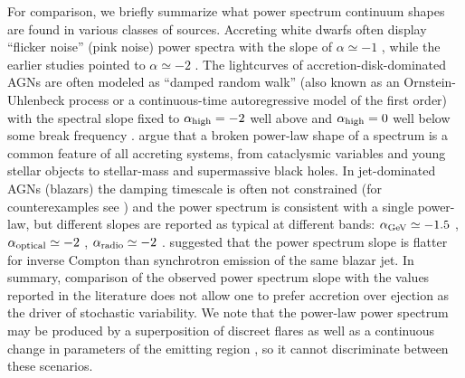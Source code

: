 \documentclass[twocolumn]{aastex631}
\begin{document}
For comparison, we briefly summarize what power spectrum continuum shapes are
found in various classes of sources. 
Accreting white dwarfs often display ``flicker noise'' (pink noise) power spectra with
the slope of $\alpha \simeq -1$ 
\citep{2008ApJ...676.1240B,2012MNRAS.420.2467D,2016MNRAS.463.3799B,2022MNRAS.509.4669B},
while the earlier studies pointed to $\alpha \simeq -2$ \citep{1986MNRAS.220..895E,1992A&A...266..237B}.
The lightcurves of accretion-disk-dominated AGNs are often modeled as ``damped random walk'' 
(also known as an Ornstein-Uhlenbeck process or a continuous-time autoregressive model of the first order) 
with the spectral slope fixed to $\alpha_{\rm high}= -2$ well above and $\alpha_{\rm high}= 0$ well below 
some break frequency \citep{2010ApJ...721.1014M,2020ApJ...899..136B,2022MNRAS.514..164S}. 
\cite{2015SciA....1E0686S} argue that a broken power-law shape of a spectrum is 
a common feature of all accreting systems, from cataclysmic variables 
and young stellar objects to stellar-mass and supermassive black holes.
In jet-dominated AGNs (blazars) the damping timescale is
often not constrained (for counterexamples see \citealt{2014ApJ...786..143S}) 
and the power spectrum is consistent with a single
power-law, but different slopes are reported as typical at different bands:
$\alpha_{\rm GeV} \simeq -1.5$ \citep{2014MNRAS.445..428M,2020ApJS..250....1T,2020ApJ...891..120B}, 
$\alpha_{\rm optical} \simeq -2$ \citep{2021Sci...373..789B,2023MNRAS.518.1459P}, 
$\alpha_{\rm radio} \simeq -2$ \citep{2014MNRAS.445..428M,2017ApJ...834..157P}.
\cite{2022ApJ...927..214G} suggested that the power spectrum slope is flatter for 
inverse Compton than synchrotron emission of the same blazar jet.
In summary, comparison of the observed power spectrum slope with
the values reported in the literature does not allow one to prefer accretion
over ejection as the driver of stochastic variability.
We note that the power-law power spectrum may be produced by 
a superposition of discreet flares \citep{1972ApJ...174L..35T,1993NCimC..16..675B} 
as well as a continuous change in parameters of the emitting region
\citep{1997MNRAS.292..679L}, so it cannot discriminate between these scenarios.
\end{document}
